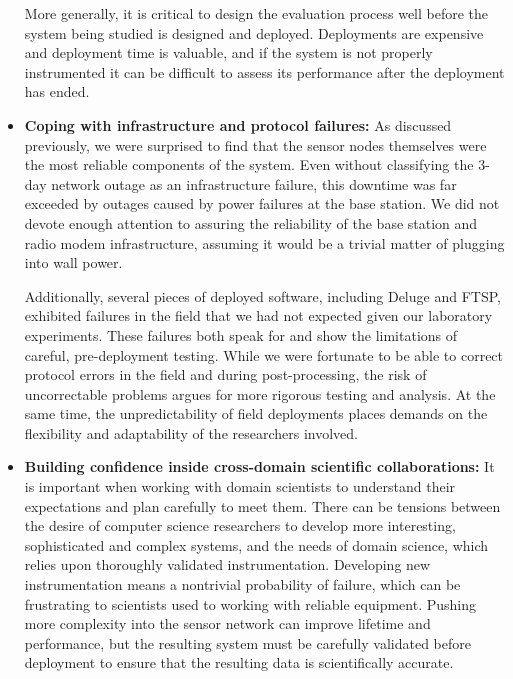 \begin{itemize}
\hspace{0.25in} More generally, it is critical to design the evaluation
process well before the system being studied is designed and deployed.
Deployments are expensive and deployment time is valuable, and if the system
is not properly instrumented it can be difficult to assess its performance
after the deployment has ended.

\vfill\eject

\item \textbf{Coping with infrastructure and protocol failures:} As discussed
previously, we were surprised to find that the sensor nodes themselves were
the most reliable components of the system. Even without classifying the
3-day network outage as an infrastructure failure, this downtime was far
exceeded by outages caused by power failures at the base station. We did not
devote enough attention to assuring the reliability of the base station and
radio modem infrastructure, assuming it would be a trivial matter of plugging
into wall power.

\hspace{0.25in} Additionally, several pieces of deployed software, including
Deluge and FTSP, exhibited failures in the field that we had not expected
given our laboratory experiments. These failures both speak for and show the
limitations of careful, pre-deployment testing. While we were fortunate to be
able to correct protocol errors in the field and during post-processing, the
risk of uncorrectable problems argues for more rigorous testing and analysis.
At the same time, the unpredictability of field deployments places demands on
the flexibility and adaptability of the researchers involved.

\item \textbf{Building confidence inside cross-domain scientific
collaborations:} It is important when working with domain scientists to
understand their expectations and plan carefully to meet them. There can be
tensions between the desire of computer science researchers to develop more
interesting, sophisticated and complex systems, and the needs of domain
science, which relies upon thoroughly validated instrumentation. Developing
new instrumentation means a nontrivial probability of failure, which can be
frustrating to scientists used to working with reliable equipment. Pushing
more complexity into the sensor network can improve lifetime and performance,
but the resulting system must be carefully validated before deployment to
ensure that the resulting data is scientifically accurate.


\end{itemize}
